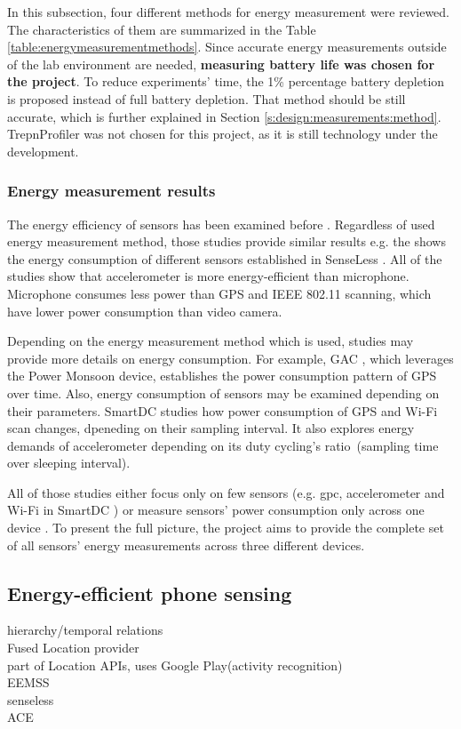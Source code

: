 In this subsection, four different methods for energy measurement were reviewed. The characteristics of them are summarized in the Table \ref{table:energymeasurementmethods}. Since accurate energy measurements outside of the lab environment are needed, \textbf{measuring battery life was chosen for the project}.  To reduce experiments' time, the 1\% percentage battery depletion is proposed instead of full battery depletion. That method should be still accurate, which is further explained in Section \ref{s:design:measurements:method}. TrepnProfiler was not chosen for this project, as it is still technology under the development.

\subsubsection{Energy measurement results}
The energy efficiency of sensors has been examined before \cite{benabdesslem:senseless} \cite{constandache:localization} \cite{wang:eemss} \cite{chon:smartdc}. Regardless of used energy measurement method, those studies provide similar results e.g. the  shows the energy consumption of different sensors established in SenseLess \cite{benabdesslem:senseless}. All of the studies show that accelerometer is more energy-efficient than microphone. Microphone consumes less power than GPS and IEEE 802.11 scanning, which have lower power consumption than video camera.


Depending on the energy measurement method which is used, studies may provide more details on energy consumption. For example, GAC \cite{youssef:gac}, which leverages the Power Monsoon device, establishes the power consumption pattern of GPS over time. Also, energy consumption of sensors may be examined depending on their parameters. SmartDC \cite{chon:smartdc} studies how power consumption of GPS and Wi-Fi scan changes, dpeneding on their sampling interval. It also explores energy demands of accelerometer depending on its duty cycling's ratio\ (sampling time over sleeping interval).

All of those studies either focus only  on few sensors (e.g. gpc, accelerometer and Wi-Fi in SmartDC \cite{chon:smartdc}) or measure sensors' power consumption only across one device \cite{benabdesslem:senseless}. To present the full picture, the project aims to provide the complete set of all sensors' energy measurements across three different devices. 
	
\subsection{Energy-efficient phone sensing}
hierarchy/temporal relations\\
	Fused Location provider\cite{android:locationapi}\\
		part of Location APIs, uses Google Play(activity recognition)\\
	EEMSS \cite{wang:eemss}\\
	senseless \cite{benabdesslem:senseless}\\
	ACE \cite{nath:ace}\\

